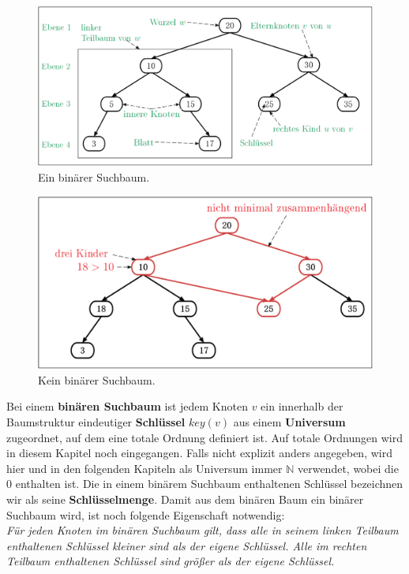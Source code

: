 \documentclass[a4paper,12pt]{article}
\begin{document}
\begin{figure}[H]
	\centering
	\includegraphics[width= 1\textwidth]{"Medien/Einleitung/ioSuchbaum"}
	\caption{Ein binärer Suchbaum. }
	\label{fig:ioSuchbaum}
\end{figure}
\begin{figure}[H]
	\centering
	\includegraphics[width= 1\textwidth]{"Medien/Einleitung/nioSuchbaum"}
	\caption{Kein binärer Suchbaum. }
	\label{fig:nioSuchbaum}
\end{figure}

\noindent Bei einem \textbf{binären Suchbaum} ist jedem Knoten $v$ ein innerhalb der Baumstruktur eindeutiger \textbf{Schlüssel} $\mathit{key}\left(v\right)$ aus einem \textbf{Universum} zugeordnet, auf dem eine totale Ordnung definiert ist. Auf totale Ordnungen wird in diesem Kapitel noch eingegangen. Falls nicht explizit anders angegeben, wird hier und in den folgenden Kapiteln als Universum immer $\mathbb{N}$ verwendet, wobei die $0$ enthalten ist. Die in einem binärem Suchbaum enthaltenen Schlüssel bezeichnen wir als seine \textbf{Schlüsselmenge}.  Damit aus dem binären Baum ein binärer Suchbaum wird, ist noch folgende Eigenschaft notwendig:\\
\textit{Für jeden Knoten im binären Suchbaum gilt, dass alle in seinem linken Teilbaum enthaltenen Schlüssel kleiner sind als der eigene Schlüssel. Alle im rechten Teilbaum enthaltenen Schlüssel sind größer als der eigene Schlüssel.} \\
\end{document}
